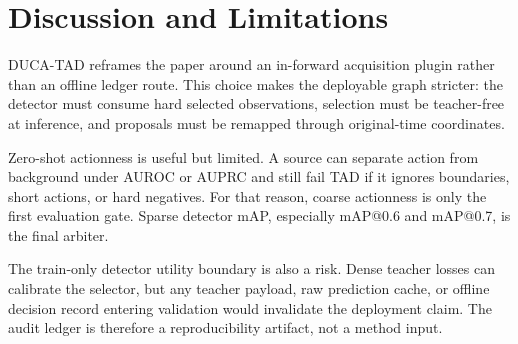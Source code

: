 \section{Discussion and Limitations}

DUCA-TAD reframes the paper around an in-forward acquisition plugin rather than an
offline ledger route. This choice makes the deployable graph stricter: the
detector must consume hard selected observations, selection must be teacher-free
at inference, and proposals must be remapped through original-time coordinates.

Zero-shot actionness is useful but limited. A source can separate action from
background under AUROC or AUPRC and still fail TAD if it ignores boundaries,
short actions, or hard negatives. For that reason, coarse actionness is only the
first evaluation gate. Sparse detector mAP, especially mAP@0.6 and mAP@0.7, is
the final arbiter.

The train-only detector utility boundary is also a risk. Dense teacher losses
can calibrate the selector, but any teacher payload, raw prediction cache, or
offline decision record entering validation would invalidate the deployment
claim. The audit ledger is therefore a reproducibility artifact, not a method
input.
